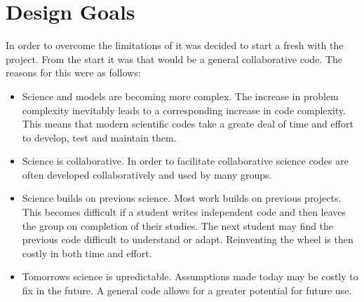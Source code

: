 \section{\OpenCMISS Design Goals}
\label{sec:IntroOpenCMISSDesignGoals}

In order to overcome the limitations of \CMISS it was decided to start
a fresh with the \OpenCMISS project. From the start it was that
\OpenCMISS would be a general collaborative code. The reasons for this
were as follows:
\begin{itemize}
  \item Science and models are becoming more complex. The increase in
    problem complexity inevitably leads to a corresponding increase in
    code complexity. This means that modern scientific codes take a
    greate deal of time and effort to develop, test and maintain them.
  \item Science is collaborative. In order to facilitate collaborative
    science codes are often developed collaboratively and used by many
    groups.
  \item Science builds on previous science. Most work builds on
    previous projects. This becomes difficult if a student writes
    independent code and then leaves the group on completion of their
    studies. The next student may find the previous code difficult to
    understand or adapt. Reinventing the wheel is then costly in both
    time and effort.
  \item Tomorrows science is upredictable. Assumptions made today may
    be costly to fix in the future. A general code allows for a
    greater potential for future use.
\end{itemize}

